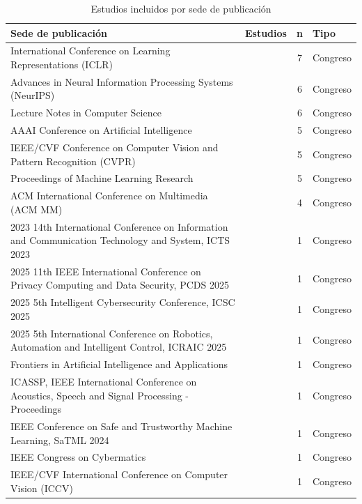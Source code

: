 \begin{table}[p]
\caption{Estudios incluidos por sede de publicación}\label{tab:sedes}
\footnotesize
\begin{tabularx}{\textwidth}{@{}Y{1.0}L{3.2cm}cl@{}}
\toprule
Sede de publicación & Estudios & n & Tipo \\
\midrule
International Conference on Learning Representations (ICLR) & \cite{S0014,S0068,S0075,S0101,S0112,S0133,S0150} & 7 & Congreso \\
Advances in Neural Information Processing Systems (NeurIPS) & \cite{S0005,S0027,S0056,S0074,S0129,S0148} & 6 & Congreso \\
Lecture Notes in Computer Science & \cite{S0049,S0061,S0079,S0113,S0121,S0144} & 6 & Congreso \\
AAAI Conference on Artificial Intelligence & \cite{S0023,S0040,S0043,S0088,S0109} & 5 & Congreso \\
IEEE/CVF Conference on Computer Vision and Pattern Recognition (CVPR) & \cite{S0003,S0030,S0054,S0063,S0138} & 5 & Congreso \\
Proceedings of Machine Learning Research & \cite{S0062,S0072,S0082,S0093,S0105} & 5 & Congreso \\
ACM International Conference on Multimedia (ACM MM) & \cite{S0032,S0039,S0094,S0124} & 4 & Congreso \\
2023 14th International Conference on Information and Communication Technology and System, ICTS 2023 & \cite{S0077} & 1 & Congreso \\
2025 11th IEEE International Conference on Privacy Computing and Data Security, PCDS 2025 & \cite{S0135} & 1 & Congreso \\
2025 5th Intelligent Cybersecurity Conference, ICSC 2025 & \cite{S0090} & 1 & Congreso \\
2025 5th International Conference on Robotics, Automation and Intelligent Control, ICRAIC 2025 & \cite{S0143} & 1 & Congreso \\
Frontiers in Artificial Intelligence and Applications & \cite{S0123} & 1 & Congreso \\
ICASSP, IEEE International Conference on Acoustics, Speech and Signal Processing - Proceedings & \cite{S0038} & 1 & Congreso \\
IEEE Conference on Safe and Trustworthy Machine Learning, SaTML 2024 & \cite{S0145} & 1 & Congreso \\
IEEE Congress on Cybermatics & \cite{S0007} & 1 & Congreso \\
IEEE/CVF International Conference on Computer Vision (ICCV) & \cite{S0151} & 1 & Congreso \\

\end{tabularx}
\end{table}
